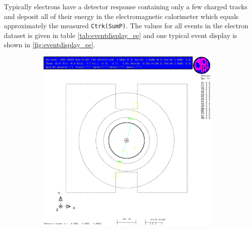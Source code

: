 \documentclass[11pt, a4paper]{article}
\numberwithin{equation}{section}
\begin{document}
Typically electrons have a detector response containing only a few charged tracks and deposit all of their energy in the electromagnetic calorimeter which equals approximately the measured \texttt{Ctrk(SumP)}.
The values for all events in the electron dataset is given in table \ref{tab:eventdisplay_ee} and one typical event display is shown in \ref{fig:eventdisplay_ee}.
\begin{figure}[h]
	\centering
	\begin{subfigure}{\textwidth}
		\centering
		\includegraphics[width=.9\textwidth]{./data/tag1/ee_pics/cropped/ee_02}
	\end{subfigure}
\end{figure}
\end{document}
